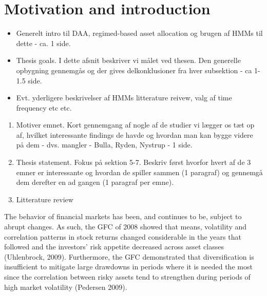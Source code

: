 \section{Motivation and introduction}
\label{section: introduction}


\begin{itemize}
    \item Generelt intro til DAA, regimed-based asset allocation og brugen af HMMs til dette - ca. 1 side.
    \item Thesis goals. I dette afsnit beskriver vi målet ved thesen. Den generelle opbygning gennemgås og der gives delkonklusioner fra hver subsektion - ca 1-1.5 side.
    \item Evt. yderligere beskrivelser af HMMs litterature reivew, valg af time frequency etc etc.
\end{itemize}

\begin{enumerate}
    \item Motiver emnet. Kort gennemgang af nogle af de studier vi lægger os tæt op af, hvilket interessante findings de havde og hvordan man kan bygge videre på dem - dvs. mangler - Bulla, Ryden, Nystrup - 1 side.
    \item Thesis statement. Fokus på sektion 5-7. Beskriv først hvorfor hvert af de 3 emner er interessante og hvordan de spiller sammen (1 paragraf) og gennemgå dem derefter en ad gangen (1 paragraf per emne).
    \item Litterature review
\end{enumerate}

The behavior of financial markets has been, and continues to be, subject to abrupt changes. As such, the GFC of 2008 showed that means, volatility and correlation patterns in stock returns changed considerable in the years that followed and the investors' risk appetite decreased across asset classes (Uhlenbrock, 2009). Furthermore, the GFC demonstrated that diversification is insufficient to mitigate large drawdowns in periods where it is needed the most since the correlation between risky assets tend to strengthen during periods of high market volatility (Pedersen 2009). 

